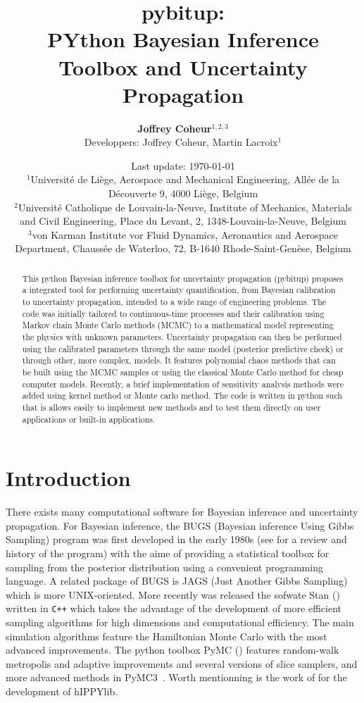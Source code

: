 \documentclass[a4paper,11pt]{article}
\title{\huge \textbf{pybitup: \\ PYthon Bayesian Inference Toolbox and Uncertainty Propagation}}
\author{\textbf{Joffrey Coheur$^{1, 2, 3}$} \\ \vspace{5pt} Developpers: Joffrey Coheur, Martin Lacroix$^{1}$}
\date{Last update: \today \\ 
\vspace{40pt}
$^1$Universit\'e de Li\`ege, Aerospace and Mechanical Engineering, All\'ee de la D\'ecouverte 9, 4000 Li\`ege, Belgium \\ 
\vspace{5pt}  
$^2$Universit\'e Catholique de Louvain-la-Neuve, Institute of Mechanics, Materials and Civil Engineering, Place du Levant, 2, 1348-Louvain-la-Neuve, Belgium \\
\vspace{5pt}  
$^3$von Karman Institute vor Fluid Dynamics, Aeronautics and Aerospace Department, Chaussée de Waterloo, 72, B-1640 Rhode-Saint-Genèse, Belgium}
\begin{document}
\begin{titlingpage}
    \maketitle
    \begin{abstract}
This python Bayesian inference toolbox for uncertainty propagation (pybitup) proposes a integrated tool for performing uncertainty quantification, from Bayesian calibration to uncertainty propagation, intended to a wide range of engineering problems. The code was initially tailored to continuous-time processes and their calibration using Markov chain Monte Carlo methods (MCMC) to a mathematical model representing the physics with unknown parameters. Uncertainty propagation can then be performed using the calibrated parameters through the same model (posterior predictive check) or through other, more complex, models. It features polynomial chaos methods that can be built using the MCMC samples or using the classical Monte Carlo method for cheap computer models. Recently, a brief implementation of sensitivity analysis methods were added using kernel method or Monte carlo method. The code is written in python such that is allows easily to implement new methods and to test them directly on user applications or built-in applications.
    \end{abstract}
\end{titlingpage}




\section{Introduction} 

There exists many computational software for Bayesian inference and uncertainty propagation. For Bayesian inference, the BUGS (Bayesian inference Using Gibbs Sampling) program was first developed in the early 1980s  (see \cite{Lunn_2009} for a review and history of the program) with the aime of providing a statistical toolbox for sampling from the posterior distribution using a convenient programming language. A related package of BUGS is JAGS (Just Another Gibbs Sampling) which is more UNIX-oriented. More recently was released the sofwate Stan (\cite{Carpenter_2017}) written in \texttt{C++} which takes the advantage of the development of more efficient sampling algorithms for high dimensions and computational efficiency. The main simulation algorithms feature the Hamiltonian Monte Carlo with the most advanced improvements. The python toolbox PyMC (\cite{Patil_2010}) features random-walk metropolis and adaptive improvements and several versions of slice samplers, and more advanced methods in PyMC3~\cite{Salvatier_2016}. Worth mentionning is the work of \cite{VillaPetraGhattas19} for the development of  hIPPYlib. 
\end{document}
